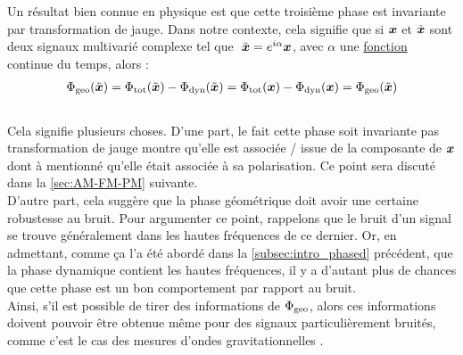 Un résultat bien connue en physique \cite{bohm_geometric_2003,mukunda_quantum_1993,nakahara_geometry_2003} est que cette troisième phase est invariante par transformation de jauge. Dans notre contexte, cela signifie que si $\boldsymbol{x}$ et $\Tilde{\boldsymbol{x}}$ sont deux signaux multivarié complexe tel que $\ \Tilde{\boldsymbol{x}} = e^{i\alpha}\boldsymbol{x}$, avec $\alpha$ une \underline{fonction} continue du temps, alors :
\begin{align*}
	\Phi_{\text{\normalfont geo}}(\Tilde{\boldsymbol{x}}) &= \Phi_{\text{\normalfont tot}}(\Tilde{\boldsymbol{x}}) - \Phi_{\text{\normalfont dyn}}(\Tilde{\boldsymbol{x}})  = \Phi_{\text{\normalfont tot}}(\boldsymbol{x}) - \Phi_{\text{\normalfont dyn}}(\boldsymbol{x}) = \Phi_{\text{\normalfont geo}}(\Tilde{\boldsymbol{x}})\\
\end{align*}
\\
Cela signifie plusieurs choses. 
D'une part, le fait cette phase soit invariante pas transformation de jauge montre qu'elle est associée / issue de la composante de $\boldsymbol{x}$ dont à mentionné qu'elle était associée à sa polarisation. 
Ce point sera discuté dans la \cref{sec:AM-FM-PM} suivante.
 \\
D'autre part, cela suggère que la phase géométrique doit avoir une certaine robustesse au bruit. Pour argumenter ce point, rappelons que le bruit d'un signal se trouve généralement dans les hautes fréquences de ce dernier.
Or, en admettant, comme ça l'a été abordé dans la \cref{subsec:intro_phased} précédent, que la phase dynamique contient les hautes fréquences, il y a d'autant plus de chances que cette phase est un bon comportement par rapport au bruit.
\\
Ainsi, s'il est possible de tirer des informations de $\Phi_{\text{\normalfont geo}}$, alors ces informations doivent pouvoir être obtenue même pour des signaux particulièrement bruités, comme c'est le cas des mesures d'ondes gravitationnelles .
\\

